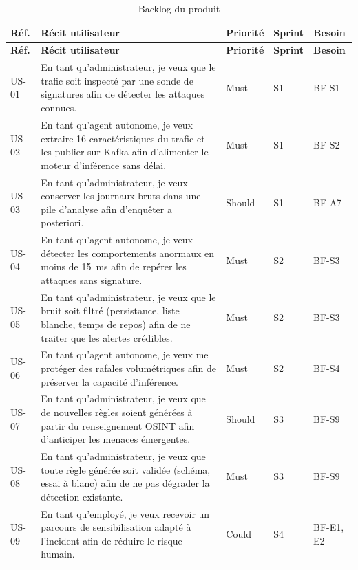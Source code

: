 \begin{xltabular}{\textwidth}{|l|>{\raggedright\arraybackslash}X|l|l|l|}

\caption{Backlog du produit}
\label{tab:backlog} \\

\hline
{} 
\textbf{Réf.} & \textbf{Récit utilisateur} & \textbf{Priorité} & \textbf{Sprint} & \textbf{Besoin} \\ \hline
\endfirsthead

\hline
{} 
\textbf{Réf.} & \textbf{Récit utilisateur} & \textbf{Priorité} & \textbf{Sprint} & \textbf{Besoin} \\ \hline
\endhead

US-01 & En tant qu'administrateur, je veux que le trafic soit inspecté par une sonde de signatures afin de détecter les attaques connues. & Must & S1 & BF-S1 \\ \hline
US-02 & En tant qu'agent autonome, je veux extraire 16 caractéristiques du trafic et les publier sur Kafka afin d'alimenter le moteur d'inférence sans délai. & Must & S1 & BF-S2 \\ \hline
US-03 & En tant qu'administrateur, je veux conserver les journaux bruts dans une pile d'analyse afin d'enquêter a posteriori. & Should & S1 & BF-A7 \\ \hline
US-04 & En tant qu'agent autonome, je veux détecter les comportements anormaux en moins de 15~ms afin de repérer les attaques sans signature. & Must & S2 & BF-S3 \\ \hline
US-05 & En tant qu'administrateur, je veux que le bruit soit filtré (persistance, liste blanche, temps de repos) afin de ne traiter que les alertes crédibles. & Must & S2 & BF-S3 \\ \hline
US-06 & En tant qu'agent autonome, je veux me protéger des rafales volumétriques afin de préserver la capacité d'inférence. & Must & S2 & BF-S4 \\ \hline
US-07 & En tant qu'administrateur, je veux que de nouvelles règles soient générées à partir du renseignement OSINT afin d'anticiper les menaces émergentes. & Should & S3 & BF-S9 \\ \hline
US-08 & En tant qu'administrateur, je veux que toute règle générée soit validée (schéma, essai à blanc) afin de ne pas dégrader la détection existante. & Must & S3 & BF-S9 \\ \hline
US-09 & En tant qu'employé, je veux recevoir un parcours de sensibilisation adapté à l'incident afin de réduire le risque humain. & Could & S4 & BF-E1, E2 \\ \hline

\end{xltabular}
